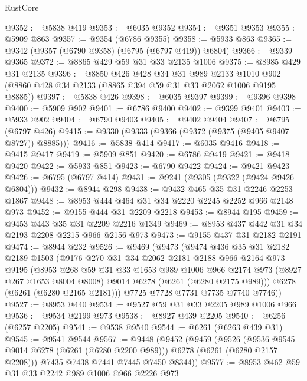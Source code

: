 \begin{lexlean}{RustCore}
\begin{coremodule}
@9352 := @5838 @419
@9353 := @6035 @9352
@9354 := @9351 @9353
@9355 := @5909 @863
@9357 := @9354 (@6786 @9355)
@9358 := @5933 @863
@9365 := @9342 (@9357 (@6790 @9358) (@6795 (@6797 @419)) @6804)
@9366 := @9339 @9365
@9372 := @8865 @429 @59 @31 @33 @2135 @1006
@9375 := @8985 @429 @31 @2135
@9396 := @8850
    @426
    @428
    @34
    @31
    @989
    @2133
    @1010
    @902
    (@8860 @428 @34 @2133 (@8865 @394 @59 @31 @33 @2062 @1006 @9195 @8885))
@9397 := @5838 @426
@9398 := @6035 @9397
@9399 := @9396 @9398
@9400 := @5909 @902
@9401 := @6786 @9400
@9402 := @9399 @9401
@9403 := @5933 @902
@9404 := @6790 @9403
@9405 := @9402 @9404
@9407 := @6795 (@6797 @426)
@9415 := @9330 (@9333 (@9366 (@9372 (@9375 (@9405 @9407 @8727)) @8885)))
@9416 := @5838 @414
@9417 := @6035 @9416
@9418 := @9415 @9417
@9419 := @5909 @851
@9420 := @6786 @9419
@9421 := @9418 @9420
@9422 := @5933 @851
@9423 := @6790 @9422
@9424 := @9421 @9423
@9426 := @6795 (@6797 @414)
@9431 := @9241 (@9305 (@9322 (@9424 @9426 @6804)))
@9432 := @8944 @298
@9438 := @9432 @465 @35 @31 @2246 @2253 @1867
@9448 := @8953 @444 @464 @31 @34 @2220 @2245 @2252 @966 @2148 @973
@9452 := @9155 @444 @31 @2209 @2218
@9453 := @8944 @195
@9459 := @9453 @443 @35 @31 @2209 @2216 @1349
@9469 := @8953 @437 @442 @31 @34 @2193 @2208 @2215 @966 @2156 @973
@9473 := @9155 @437 @31 @2182 @2191
@9474 := @8944 @232
@9526 := @9469
    (@9473
      (@9474
        @436
        @35
        @31
        @2182
        @2189
        @1503
        (@9176
          @270
          @31
          @34
          @2062
          @2181
          @2188
          @966
          @2164
          @973
          @9195
          (@8953
            @268
            @59
            @31
            @33
            @1653
            @989
            @1006
            @966
            @2174
            @973
            (@8927 @267 @1653 @8004 @8008)
            @9014
            @6278
            (@6261 (@6280 @2175 @989)))
          @6278
          (@6261 (@6280 @2165 @2181)))
        @7725
        @7728
        @7731
        @7735
        @7740
        @7746))
@9527 := @8953 @440
@9534 := @9527 @59 @31 @33 @2205 @989 @1006 @966
@9536 := @9534 @2199 @973
@9538 := @8927 @439 @2205
@9540 := @6256 (@6257 @2205)
@9541 := @9538 @9540
@9544 := @6261 (@6263 @439 @31)
@9545 := @9541 @9544
@9567 := @9448
    (@9452
      (@9459
        (@9526
          (@9536 @9545 @9014 @6278 (@6261 (@6280 @2200 @989)))
          @6278
          (@6261 (@6280 @2157 @2208)))
        @7435
        @7438
        @7441
        @7445
        @7450
        @8344))
@9577 := @8953 @462 @59 @31 @33 @2242 @989 @1006 @966 @2226 @973

\end{coremodule}
\end{lexlean}
